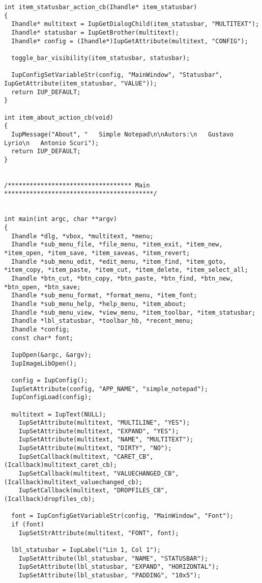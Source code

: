 \documentclass{ctexart}
\begin{document}
\begin{lstlisting}
int item_statusbar_action_cb(Ihandle* item_statusbar)
{
  Ihandle* multitext = IupGetDialogChild(item_statusbar, "MULTITEXT");
  Ihandle* statusbar = IupGetBrother(multitext);
  Ihandle* config = (Ihandle*)IupGetAttribute(multitext, "CONFIG");

  toggle_bar_visibility(item_statusbar, statusbar);

  IupConfigSetVariableStr(config, "MainWindow", "Statusbar", IupGetAttribute(item_statusbar, "VALUE"));
  return IUP_DEFAULT;
}

int item_about_action_cb(void)
{
  IupMessage("About", "   Simple Notepad\n\nAutors:\n   Gustavo Lyrio\n   Antonio Scuri");
  return IUP_DEFAULT;
}


/********************************** Main *****************************************/


int main(int argc, char **argv)
{
  Ihandle *dlg, *vbox, *multitext, *menu;
  Ihandle *sub_menu_file, *file_menu, *item_exit, *item_new, *item_open, *item_save, *item_saveas, *item_revert;
  Ihandle *sub_menu_edit, *edit_menu, *item_find, *item_goto, *item_copy, *item_paste, *item_cut, *item_delete, *item_select_all;
  Ihandle *btn_cut, *btn_copy, *btn_paste, *btn_find, *btn_new, *btn_open, *btn_save;
  Ihandle *sub_menu_format, *format_menu, *item_font;
  Ihandle *sub_menu_help, *help_menu, *item_about;
  Ihandle *sub_menu_view, *view_menu, *item_toolbar, *item_statusbar;
  Ihandle *lbl_statusbar, *toolbar_hb, *recent_menu;
  Ihandle *config;
  const char* font;

  IupOpen(&argc, &argv);
  IupImageLibOpen();

  config = IupConfig();
  IupSetAttribute(config, "APP_NAME", "simple_notepad");
  IupConfigLoad(config);

  multitext = IupText(NULL);
    IupSetAttribute(multitext, "MULTILINE", "YES");
    IupSetAttribute(multitext, "EXPAND", "YES");
    IupSetAttribute(multitext, "NAME", "MULTITEXT");
    IupSetAttribute(multitext, "DIRTY", "NO");
    IupSetCallback(multitext, "CARET_CB", (Icallback)multitext_caret_cb);
    IupSetCallback(multitext, "VALUECHANGED_CB", (Icallback)multitext_valuechanged_cb);
    IupSetCallback(multitext, "DROPFILES_CB", (Icallback)dropfiles_cb);

  font = IupConfigGetVariableStr(config, "MainWindow", "Font");
  if (font)
    IupSetStrAttribute(multitext, "FONT", font);

  lbl_statusbar = IupLabel("Lin 1, Col 1");
    IupSetAttribute(lbl_statusbar, "NAME", "STATUSBAR");  
    IupSetAttribute(lbl_statusbar, "EXPAND", "HORIZONTAL");
    IupSetAttribute(lbl_statusbar, "PADDING", "10x5");


\end{lstlisting}
\end{document}
